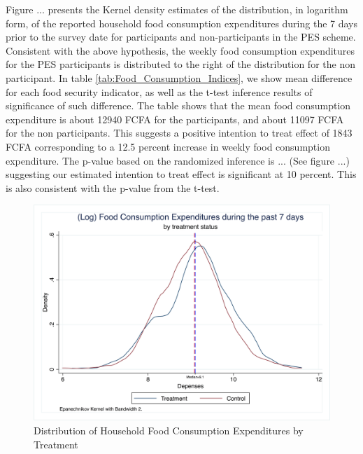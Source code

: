 \documentclass[preprint,12pt]{elsarticle}
\begin{document}
 Figure ... presents the Kernel density estimates of the distribution, in logarithm form, of the reported household food consumption expenditures during the 7 days prior to the survey date for participants and non-participants in the PES scheme. Consistent with the above hypothesis, the weekly food consumption expenditures for the PES participants is distributed to the right of the distribution for the non participant. In table \ref*{tab:Food_Consumption_Indices}, we show mean difference for each food security indicator, as well as the t-test inference results of significance of such difference. The table shows that the mean food consumption expenditure is about 12940 FCFA for the participants, and about 11097 FCFA for the non participants. This suggests a positive intention to treat effect of 1843 FCFA corresponding to a 12.5 percent increase in weekly food consumption expenditure. The p-value based on the randomized inference is ... (See figure ...) suggesting our estimated intention to treat effect is significant at 10 percent. This is also consistent with the p-value from the t-test.   \par

\begin{figure}[ht!]
	\footnotesize
	\centering
	\caption{Distribution of Household Food Consumption Expenditures by Treatment \label{fig:map_overview}}
	\includegraphics[width=0.9\linewidth]{kdensity_LOG_FoodConsExp.png}
\end{figure}
\FloatBarrier
\end{document}
